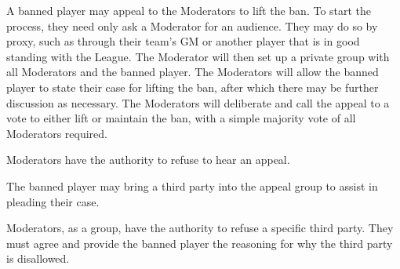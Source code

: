 \begin{deepEnumerate}
\begin{deepEnumerate}
		\item A banned player may appeal to the Moderators to lift the ban. To start the process, they need only ask a Moderator for an audience. They may do so by proxy, 
		such as through their team's GM or another player that is in good standing with the League. The Moderator will then set up a private group with all 
		Moderators and the banned player. The Moderators will allow the banned player to state their case for lifting the ban, after which there may be further discussion 
		as necessary. The Moderators will deliberate and call the appeal to a vote to either lift or maintain the ban, with a simple majority vote of all Moderators required.
		\begin{deepEnumerate}
			\item Moderators have the authority to refuse to hear an appeal.
			\item The banned player may bring a third party into the appeal group to assist in pleading their case.
			\begin{deepEnumerate}
				\item Moderators, as a group, have the authority to refuse a specific third party. 
				They must agree and provide the banned player the reasoning for why the third party is disallowed.
			\end{deepEnumerate}
		\end{deepEnumerate}
	\end{deepEnumerate}
\end{deepEnumerate}
